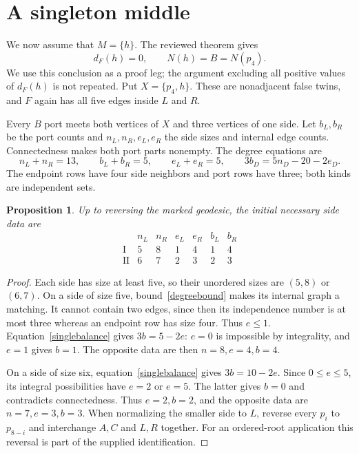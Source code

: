 \documentclass[11pt]{article}
\newtheorem{proposition}[theorem]{Proposition}
\begin{document}
\section*{A singleton middle}

We now assume that $M=\{h\}$. The reviewed theorem
\cite[Theorem~2]{singleton} gives
\begin{equation}\label{isolation}
 d_F(h)=0,\qquad N(h)=B=N(p_4).
\end{equation}
We use this conclusion as a proof leg; the argument excluding all
positive values of $d_F(h)$ is not repeated. Put $X=\{p_4,h\}$.
These are nonadjacent false twins, and $F$ again has all five edges
inside $L$ and $R$.

Every $B$ port meets both vertices of $X$ and three vertices of one side.
Let $b_L,b_R$ be the port counts and $n_L,n_R,e_L,e_R$ the side sizes
and internal edge counts. Connectedness makes both port parts nonempty.
The degree equations are
\begin{equation}\label{singlebalance}
 n_L+n_R=13,\qquad b_L+b_R=5,\qquad e_L+e_R=5,
 \qquad 3b_D=5n_D-20-2e_D.
\end{equation}
The endpoint rows have four side neighbors and port rows have three;
both kinds are independent sets.

\begin{proposition}\label{sizes}
Up to reversing the marked geodesic, the initial necessary side data are
\[
\begin{array}{c|cc|cc|cc}
 &n_L&n_R&e_L&e_R&b_L&b_R\\\hline
 \text{I}&5&8&1&4&1&4\\
 \text{II}&6&7&2&3&2&3
\end{array}
\]
\end{proposition}
\begin{proof}
Each side has size at least five, so their unordered sizes are $(5,8)$
or $(6,7)$. On a side of size five, bound~\eqref{degreebound} makes its
internal graph a matching. It cannot contain two edges, since then its
independence number is at most three whereas an endpoint row has size
four. Thus $e\leq1$. Equation~\eqref{singlebalance} gives $3b=5-2e$:
$e=0$ is impossible by integrality, and $e=1$ gives $b=1$. The opposite
data are then $n=8,e=4,b=4$.

On a side of size six, equation~\eqref{singlebalance} gives
$3b=10-2e$. Since $0\leq e\leq5$, its integral possibilities have
$e=2$ or $e=5$. The latter gives $b=0$ and contradicts connectedness.
Thus $e=2,b=2$, and the opposite data are $n=7,e=3,b=3$.
When normalizing the smaller side to $L$, reverse every $p_i$ to
$p_{8-i}$ and interchange $A,C$ and $L,R$ together. For an ordered-root
application this reversal is part of the supplied identification.
\end{proof}
\end{document}
